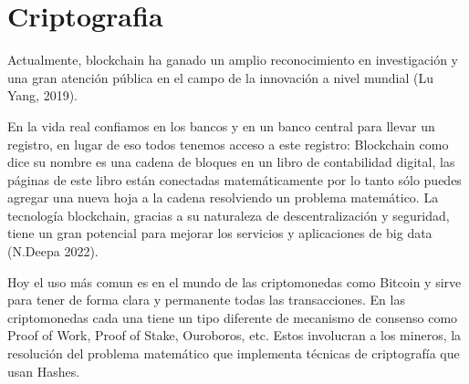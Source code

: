 \documentclass[conference]{IEEEtran}
\begin{document}
\section{Criptografia}

Actualmente, blockchain ha ganado un amplio reconocimiento en investigación y una
gran atención pública en el campo de la innovación a nivel mundial (Lu Yang, 2019).

En la vida real confiamos en los bancos y en un banco central para llevar un registro, 
en lugar de eso todos tenemos acceso a este registro: Blockchain como dice su nombre es 
una cadena de bloques en un libro de contabilidad digital, las páginas de este libro están 
conectadas matemáticamente por lo tanto sólo puedes agregar una nueva hoja a la cadena 
resolviendo un problema matemático. La tecnología blockchain, gracias a su naturaleza de 
descentralización y seguridad, tiene un gran potencial para mejorar los servicios y aplicaciones de big data (N.Deepa 2022). 

Hoy el uso más comun es en el mundo de las criptomonedas como Bitcoin y sirve para tener de forma clara y permanente 
todas las transacciones. En las criptomonedas cada una tiene un tipo diferente de mecanismo de 
consenso como Proof of Work, Proof of Stake, Ouroboros, etc. Estos involucran a los mineros, 
la resolución del problema matemático que implementa técnicas de criptografía que usan Hashes.
\end{document}
